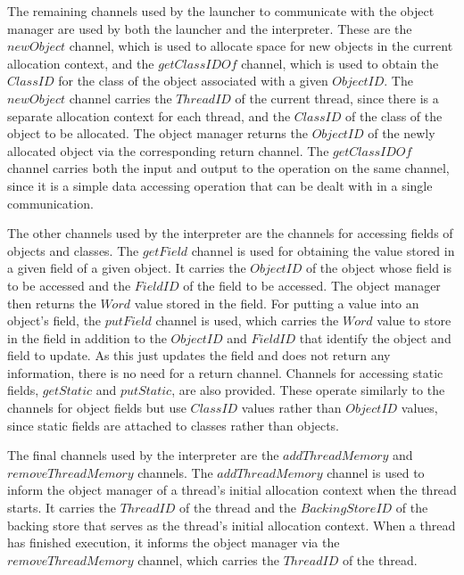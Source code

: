 The remaining channels used by the launcher to communicate with the
object manager are used by both the launcher and the interpreter.
These are the $newObject$ channel, which is used to allocate space for
new objects in the current allocation context, and the $getClassIDOf$
channel, which is used to obtain the $ClassID$ for the class of the
object associated with a given $ObjectID$.
The $newObject$ channel carries the $ThreadID$ of the current thread,
since there is a separate allocation context for each thread, and the
$ClassID$ of the class of the object to be allocated.
The object manager returns the $ObjectID$ of the newly allocated
object via the corresponding return channel.
The $getClassIDOf$ channel carries both the input and output to the
operation on the same channel, since it is a simple data accessing
operation that can be dealt with in a single communication.

The other channels used by the interpreter are the channels for
accessing fields of objects and classes.
The $getField$ channel is used for obtaining the value stored in a
given field of a given object.
It carries the $ObjectID$ of the object whose field is to be accessed
and the $FieldID$ of the field to be accessed.
The object manager then returns the $Word$ value stored in the field.
For putting a value into an object's field, the $putField$ channel is
used, which carries the $Word$ value to store in the field in addition
to the $ObjectID$ and $FieldID$ that identify the object and field to
update.
As this just updates the field and does not return any information,
there is no need for a return channel.
Channels for accessing static fields, $getStatic$ and $putStatic$, are
also provided.
These operate similarly to the channels for object fields but use
$ClassID$ values rather than $ObjectID$ values, since static fields are
attached to classes rather than objects.

The final channels used by the interpreter are the $addThreadMemory$
and $removeThreadMemory$ channels.
The $addThreadMemory$ channel is used to inform the object manager of
a thread's initial allocation context when the thread starts.
It carries the $ThreadID$ of the thread and the $BackingStoreID$ of
the backing store that serves as the thread's initial allocation
context.
When a thread has finished execution, it informs the object manager
via the $removeThreadMemory$ channel, which carries the $ThreadID$ of
the thread.


